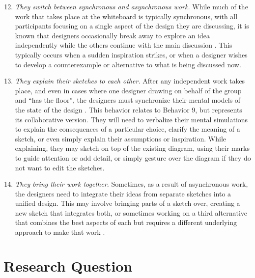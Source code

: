 \begin{enumerate}
  \setcounter{enumi}{11}
  \item \emph{They switch between synchronous and asynchronous work.} While much of the work that takes place at the whiteboard is typically synchronous, with all participants focusing on a single aspect of the design they are discussing, it is known that designers occasionally break away to explore an idea independently while the others continue with the main discussion \cite{dekel2005supporting}. This typically occurs when a sudden inspiration strikes, or when a designer wishes to develop a counterexample or alternative to what is being discussed now.

 \item \emph{They explain their sketches to each other.} After any independent work takes place, and even in cases where one designer drawing on behalf of the group and ``has the floor'', the designers must synchronize their mental models of the state of the design \cite{dekel2007notation}. This behavior relates to Behavior 9, but represents its collaborative version. They will need to verbalize their mental simulations to explain the consequences of a particular choice, clarify the meaning of a sketch, or even simply explain their assumptions or inspiration. While explaining, they may sketch on top of the existing diagram, using their marks to guide attention or add detail, or simply gesture over the diagram if they do not want to edit the sketches.

 \item \emph{They bring their work together.}  Sometimes, as a result of asynchronous work, the designers need to integrate their ideas from separate sketches into a unified design. This may involve bringing parts of a sketch over, creating a new sketch that integrates both, or sometimes working on a third alternative that combines the best aspects of each but requires a different underlying approach to make that work \cite{dekel2007notation}.
\end{enumerate}

\section{Research Question}


